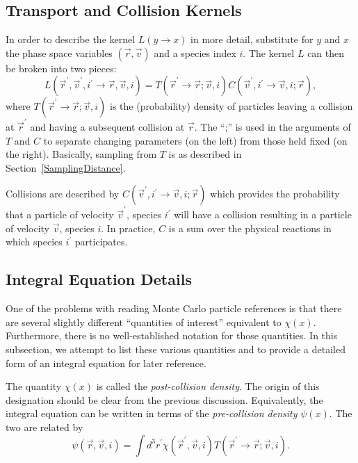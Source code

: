 \documentclass[12pt]{report}
\begin{document}
\subsection{Transport and Collision Kernels}

In order to describe the kernel $L(y \rightarrow x)$ in more detail, substitute
for $y$ and $x$ the phase space variables $(\vec{r},\vec{v})$ and a species
index $i$. The kernel $L$ can then be broken into two pieces:
\begin{equation}
L(\vec{r}^{\prime}, \vec{v}^{\prime}, i^{\prime} \rightarrow \vec{r}, 
\vec{v}, i) = T(\vec{r}^{\prime} \rightarrow \vec{r}; \vec{v}, i) C(\vec{v}^{\prime}, 
i^{\prime} \rightarrow \vec{v}, i; \vec{r}),
\end{equation}
where $T(\vec{r}^{\prime} \rightarrow \vec{r}; \vec{v}, i)$ 
is the (probability) density of particles leaving a 
collision at $\vec{r}^{\prime}$ and having a subsequent collision at $\vec{r}$. 
The ``;'' is used in
the arguments of $T$ and $C$ to separate changing parameters (on the left) from
those held fixed (on the right). Basically, sampling from $T$ is as 
described in
Section~\ref{SamplingDistance}.

Collisions are described by $C(\vec{v}^{\prime}, i^{\prime} \rightarrow 
\vec{v}, i; \vec{r})$ which provides the probability
that a particle of velocity $\vec{v}^{\prime}$, species $i^{\prime}$ 
will have a collision resulting in 
a particle of velocity $\vec{v}$, species $i$. In practice, $C$ is a 
sum over the physical
reactions in which species $i^{\prime}$ participates.

\subsection{Integral Equation Details}
\label{IntegralEquationDetails}

One of the problems with reading Monte Carlo particle references is that
there are several slightly different ``quantities of interest'' equivalent
to $\chi(x)$. Furthermore, there is no well-established notation for those
quantities. In this subsection, we attempt to list these various quantities
and to provide a detailed form of an integral equation for later reference.

The quantity $\chi(x)$ is called the {\em post-collision density}. The 
origin of this designation should be clear from the previous discussion.
Equivalently, the integral equation can be written in terms of the 
{\em pre-collision density} $\psi(x)$. The two are related by
\begin{equation}
\psi(\vec{r},\vec{v},i) = \int d^{3}r^{\prime} 
\chi(\vec{r}^{\prime},\vec{v},i) 
T(\vec{r}^{\prime} \rightarrow \vec{r}; \vec{v},i).
\label{post2pre}
\end{equation}
\end{document}
